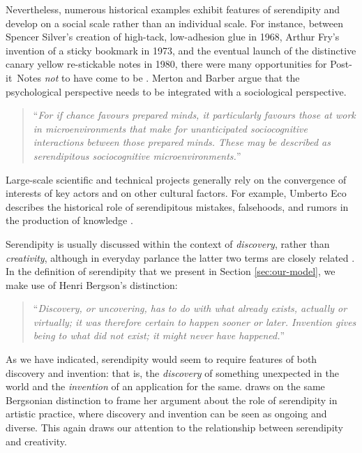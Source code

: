 Nevertheless, numerous historical examples exhibit features of
serendipity and develop on a social scale rather than an individual
scale.  For instance, between Spencer Silver's creation of high-tack,
low-adhesion glue in 1968, Arthur Fry's invention of a sticky bookmark in 1973,
and the eventual launch of the distinctive canary yellow re-stickable
notes in 1980, there were many opportunities for
Post-it\texttrademark\ Notes \emph{not} to have come to be
\cite{tce-postits}.  Merton and Barber argue that the
psychological perspective needs to be integrated with a
sociological perspective.
\begin{quote}
``\emph{For if chance favours prepared minds, it particularly favours
    those at work in microenvironments that make for unanticipated
    sociocognitive interactions between those prepared minds. These
    may be described as serendipitous sociocognitive
    microenvironments.}'' \cite[p. 259--260]{merton}
\end{quote}
Large-scale scientific and technical projects generally rely on the
convergence of interests of key actors and on other cultural factors.
For example, Umberto Eco describes the historical role of
serendipitous mistakes, falsehoods, and rumors in the production of
knowledge \citeyear{eco2013serendipities}.

Serendipity is usually discussed within
the context of \emph{discovery}, rather than \emph{creativity},
although in everyday parlance the latter two terms are closely related
\cite{jordanous12jims}.  In the definition of serendipity that we present in Section \ref{sec:our-model}, we make use
of Henri Bergson's distinction:
\begin{quote}
``\emph{Discovery, or uncovering, has to do with what already exists,
    actually or virtually; it was therefore certain to happen sooner
    or later.  Invention gives being to what did not exist; it might
    never have happened.}''~\cite[p. 58]{bergson2010creative}
\end{quote}
As we have indicated, serendipity would seem to require features of
both discovery and invention: that is, the \emph{discovery} of
something unexpected in the world and the \emph{invention} of an
application for the same.   draws on the same
Bergsonian distinction to frame her argument about the role of
serendipity in artistic practice, where discovery and invention can be
seen as ongoing and diverse.  This again draws our attention to the
relationship between serendipity and creativity.

